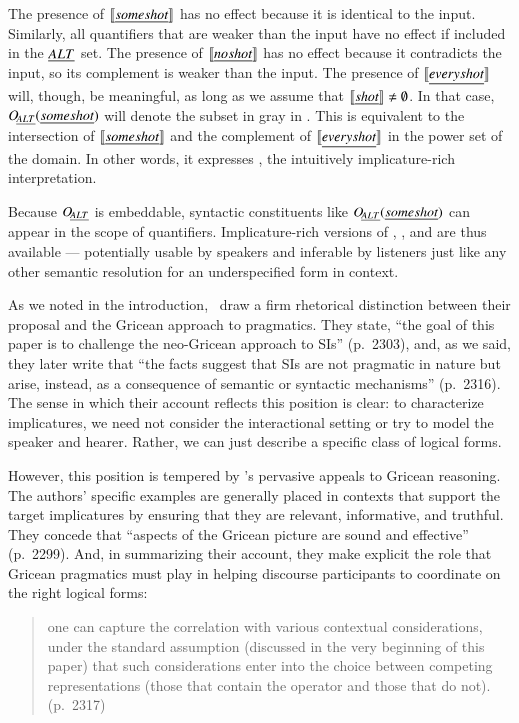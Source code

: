 \documentclass[leqno,12pt]{article}
\begin{document}
The presence of $\llbracket\emph{some shot\/}\rrbracket$ has no effect because it is
identical to the input. Similarly, all quantifiers that are weaker
than the input have no effect if included in the $\emph{ALT}$ set. The
presence of $\llbracket\emph{no shot\/}\rrbracket$ has no effect because it
contradicts the input, so its complement is weaker than the input.
The presence of $\llbracket\emph{every shot\/}\rrbracket$ will, though, be meaningful,
as long as we assume that $\llbracket\emph{shot\/}\rrbracket \neq \emptyset$.  In that
case, $\mathop{O\negthinspace_{\emph{ALT}}}(\emph{some shot\/})$ will denote the subset in gray in
.  This is equivalent to the intersection of
$\llbracket\emph{some shot\/}\rrbracket$ and the complement of
$\llbracket\emph{every shot\/}\rrbracket$ in the power set of the domain.  In other
words, it expresses , the intuitively
implicature-rich interpretation.

Because $\mathop{O\negthinspace_{\emph{ALT}}}$ is embeddable, syntactic constituents like
$\mathop{O\negthinspace_{\emph{ALT}}}(\emph{some shot})$ can appear in the scope of quantifiers.
Implicature-rich versions of , , and
 are thus available --- potentially usable by
speakers and inferable by listeners just like any other semantic
resolution for an underspecified form in context.

As we noted in the introduction, \CFS\ draw a firm rhetorical
distinction between their proposal and the Gricean approach to
pragmatics. They state, ``the goal of this paper is to challenge the
neo-Gricean approach to SIs'' (p.~2303), and, as we said, they later
write that ``the facts suggest that SIs are not pragmatic in nature
but arise, instead, as a consequence of semantic or syntactic
mechanisms'' (p.~2316). The sense in which their account reflects this
position is clear: to characterize implicatures, we need not consider
the interactional setting or try to model the speaker and
hearer. Rather, we can just describe a specific class of logical
forms.

However, this position is tempered by \CFS's pervasive appeals to
Gricean reasoning.  The authors' specific examples are generally
placed in contexts that support the target implicatures by ensuring
that they are relevant, informative, and truthful.  They concede that
``aspects of the Gricean picture are sound and effective''
(p.~2299). And, in summarizing their account, they make explicit the
role that Gricean pragmatics must play in helping discourse
participants to coordinate on the right logical forms:
%
\begin{quote}
  one can capture the correlation with various contextual
  considerations, under the standard assumption (discussed in the very
  beginning of this paper) that such considerations enter into the
  choice between competing representations (those that contain the
  operator and those that do not). (p.~2317)
\end{quote}
\end{document}
